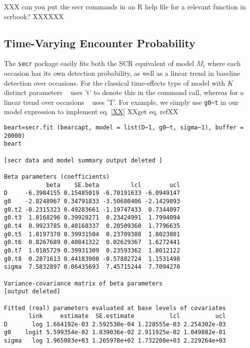 XXX can you put the secr commands in an R help file for a relevant
function in scrbook? XXXXXX


\subsection{Time-Varying Encounter Probability}

The \mbox{\tt secr} package easily fits both the SCR equivalent of model
$M_{t}$ where each
occasion has its own detection probability, as well as a linear
trend in baseline detection over occasions. For the classical
time-effects type of model with $K$ distinct parameters \secr~ uses 't' to denote
this in the command call, whereas for a linear
trend over occasions \secr~ uses 'T'.
For example, we simply use \verb+g0~t+ in
our model expression to implement eq. \ref{XX}   XXget eq. refXX


{\small
\begin{verbatim}
beart=secr.fit (bearcapt, model = list(D~1, g0~t, sigma~1), buffer = 20000)
beart

[secr data and model summary output deleted ]

Beta parameters (coefficients)
            beta    SE.beta         lcl        ucl
D     -6.3984155 0.15485019 -6.70191633 -6.0949147
g0    -2.8248967 0.34791833 -3.50680406 -2.1429893
g0.t2 -0.2315323 0.49283661 -1.19747433  0.7344097
g0.t3  1.0168296 0.39928271  0.23424991  1.7994094
g0.t4  0.9923785 0.40168337  0.20509360  1.7796635
g0.t5  1.0197370 0.39931504  0.23709388  1.8023801
g0.t6  0.8267689 0.40841322  0.02629367  1.6272441
g0.t7  1.0185729 0.39931309  0.23593362  1.8012122
g0.t8  0.2871613 0.44183900 -0.57882724  1.1531498
sigma  7.5832897 0.06435693  7.45715244  7.7094270

Variance-covariance matrix of beta parameters
[output deleted]

Fitted (real) parameters evaluated at base levels of covariates
       link     estimate  SE.estimate          lcl          ucl
D       log 1.664192e-03 2.592530e-04 1.228555e-03 2.254302e-03
g0    logit 5.599354e-02 1.839036e-02 2.911925e-02 1.049882e-01
sigma   log 1.965083e+03 1.265978e+02 1.732208e+03 2.229264e+03
\end{verbatim}
}

